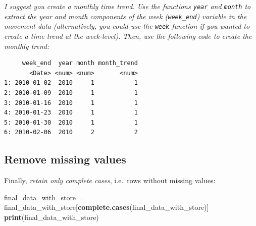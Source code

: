 \documentclass[
]{article}
\newenvironment{Shaded}{\begin{snugshade}}{\end{snugshade}}
\newcommand{\DecValTok}[1]{\textcolor[rgb]{0.00,0.00,0.81}{#1}}
\newcommand{\FunctionTok}[1]{\textcolor[rgb]{0.13,0.29,0.53}{\textbf{#1}}}
\newcommand{\NormalTok}[1]{#1}
\newcommand{\OtherTok}[1]{\textcolor[rgb]{0.56,0.35,0.01}{#1}}
\newcommand{\SpecialCharTok}[1]{\textcolor[rgb]{0.81,0.36,0.00}{\textbf{#1}}}
\begin{document}
\emph{I suggest you create a monthly time trend. Use the functions
\texttt{year} and \texttt{month} to extract the year and month
components of the week (\texttt{week\_end}) variable in the movement
data (alternatively, you could use the \texttt{week} function if you
wanted to create a time trend at the week-level). Then, use the
following code to create the monthly trend:}

\begin{Shaded}
\end{Shaded}

\begin{verbatim}
     week_end  year month month_trend
       <Date> <num> <num>       <num>
1: 2010-01-02  2010     1           1
2: 2010-01-09  2010     1           1
3: 2010-01-16  2010     1           1
4: 2010-01-23  2010     1           1
5: 2010-01-30  2010     1           1
6: 2010-02-06  2010     2           2
\end{verbatim}

\subsection{Remove missing values}\label{remove-missing-values}

Finally, \emph{retain only complete cases}, i.e.~rows without missing
values:

\begin{Shaded}
\begin{Highlighting}[]
\NormalTok{final\_data\_with\_store }\OtherTok{=}\NormalTok{ final\_data\_with\_store[}\FunctionTok{complete.cases}\NormalTok{(final\_data\_with\_store)]}
\FunctionTok{print}\NormalTok{(final\_data\_with\_store)}
\end{Highlighting}
\end{Shaded}
\end{document}
